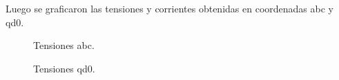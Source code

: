 \documentclass[a4paper, 10pt, onecolumn,journal]{ieeeconf}
\begin{document}
Luego se graficaron las tensiones y corrientes obtenidas en coordenadas abc y qd0.
\begin{figure}[H]
	\centering
	\begin{adjustbox}{max width=\columnwidth}
	\end{adjustbox}
	\caption{Tensiones abc.}
	\label{Tensiones abc}
\end{figure}

\begin{figure}[H]
	\centering
	\begin{adjustbox}{max width=\columnwidth}
	\end{adjustbox}
	\caption{Tensiones qd0.}
	\label{Tensiones qd0}
\end{figure}
\end{document}
